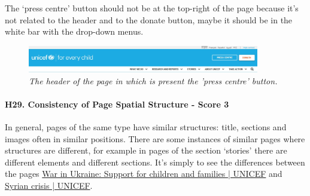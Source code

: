 \newline The ‘press centre’ button should not be at the top-right of the page because it’s not related to the header and to the donate button, maybe it should be in the white bar with the drop-down menus.
\begin{figure}[h]
	\begin{center}
		\includegraphics[width=0.9\textwidth]{FinalScores32.jpg}
		\captionsetup{font=small}
		\caption{\textit{The header of the page in which is present the 'press centre' button.}}
	\end{center}
\end{figure}
\newline
\newline \paragraph{H29. Consistency of Page Spatial Structure - Score 3}	In general, pages of the same type have similar structures: title, sections and images often in similar positions. There are some instances of similar pages where structures are different, for example in pages of the section ‘stories’ there are different elements and different sections.
\newline It’s simply to see the differences between the pages \href{https://www.unicef.org/emergencies/war-ukraine-pose-immediate-threat-children}{War in Ukraine: Support for children and families | UNICEF} and \href{https://www.unicef.org/emergencies/syrian-crisis}{Syrian crisis | UNICEF}.




















